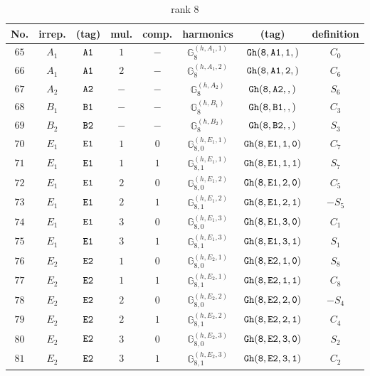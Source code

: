 \documentclass[fleqn,8pt]{jsarticle}
\begin{document}
\begin{table}[ht!]
\begin{center}
\caption{rank 8}
\renewcommand{\arraystretch}{1.3}
\begin{tabular}{cccccccc} \hline \hline
No. & irrep. & (tag) & mul. & comp. & harmonics & (tag) & definition \\ \hline
$ 65 $ & $ A_{1} $ & $ {\tt A1} $ & $ 1 $ & $ - $ & $ \mathbb{G}_{8}^{(h,A_{1},1)} $ & $ {\tt Gh(8,A1,1,)} $ & $ C_{0} $ \\
$ 66 $ & $ A_{1} $ & $ {\tt A1} $ & $ 2 $ & $ - $ & $ \mathbb{G}_{8}^{(h,A_{1},2)} $ & $ {\tt Gh(8,A1,2,)} $ & $ C_{6} $ \\
$ 67 $ & $ A_{2} $ & $ {\tt A2} $ & $ - $ & $ - $ & $ \mathbb{G}_{8}^{(h,A_{2})} $ & $ {\tt Gh(8,A2,,)} $ & $ S_{6} $ \\
$ 68 $ & $ B_{1} $ & $ {\tt B1} $ & $ - $ & $ - $ & $ \mathbb{G}_{8}^{(h,B_{1})} $ & $ {\tt Gh(8,B1,,)} $ & $ C_{3} $ \\
$ 69 $ & $ B_{2} $ & $ {\tt B2} $ & $ - $ & $ - $ & $ \mathbb{G}_{8}^{(h,B_{2})} $ & $ {\tt Gh(8,B2,,)} $ & $ S_{3} $ \\
$ 70 $ & $ E_{1} $ & $ {\tt E1} $ & $ 1 $ & $ 0 $ & $ \mathbb{G}_{8,0}^{(h,E_{1},1)} $ & $ {\tt Gh(8,E1,1,0)} $ & $ C_{7} $ \\
$ 71 $ & $ E_{1} $ & $ {\tt E1} $ & $ 1 $ & $ 1 $ & $ \mathbb{G}_{8,1}^{(h,E_{1},1)} $ & $ {\tt Gh(8,E1,1,1)} $ & $ S_{7} $ \\
$ 72 $ & $ E_{1} $ & $ {\tt E1} $ & $ 2 $ & $ 0 $ & $ \mathbb{G}_{8,0}^{(h,E_{1},2)} $ & $ {\tt Gh(8,E1,2,0)} $ & $ C_{5} $ \\
$ 73 $ & $ E_{1} $ & $ {\tt E1} $ & $ 2 $ & $ 1 $ & $ \mathbb{G}_{8,1}^{(h,E_{1},2)} $ & $ {\tt Gh(8,E1,2,1)} $ & $ - S_{5} $ \\
$ 74 $ & $ E_{1} $ & $ {\tt E1} $ & $ 3 $ & $ 0 $ & $ \mathbb{G}_{8,0}^{(h,E_{1},3)} $ & $ {\tt Gh(8,E1,3,0)} $ & $ C_{1} $ \\
$ 75 $ & $ E_{1} $ & $ {\tt E1} $ & $ 3 $ & $ 1 $ & $ \mathbb{G}_{8,1}^{(h,E_{1},3)} $ & $ {\tt Gh(8,E1,3,1)} $ & $ S_{1} $ \\
$ 76 $ & $ E_{2} $ & $ {\tt E2} $ & $ 1 $ & $ 0 $ & $ \mathbb{G}_{8,0}^{(h,E_{2},1)} $ & $ {\tt Gh(8,E2,1,0)} $ & $ S_{8} $ \\
$ 77 $ & $ E_{2} $ & $ {\tt E2} $ & $ 1 $ & $ 1 $ & $ \mathbb{G}_{8,1}^{(h,E_{2},1)} $ & $ {\tt Gh(8,E2,1,1)} $ & $ C_{8} $ \\
$ 78 $ & $ E_{2} $ & $ {\tt E2} $ & $ 2 $ & $ 0 $ & $ \mathbb{G}_{8,0}^{(h,E_{2},2)} $ & $ {\tt Gh(8,E2,2,0)} $ & $ - S_{4} $ \\
$ 79 $ & $ E_{2} $ & $ {\tt E2} $ & $ 2 $ & $ 1 $ & $ \mathbb{G}_{8,1}^{(h,E_{2},2)} $ & $ {\tt Gh(8,E2,2,1)} $ & $ C_{4} $ \\
$ 80 $ & $ E_{2} $ & $ {\tt E2} $ & $ 3 $ & $ 0 $ & $ \mathbb{G}_{8,0}^{(h,E_{2},3)} $ & $ {\tt Gh(8,E2,3,0)} $ & $ S_{2} $ \\
$ 81 $ & $ E_{2} $ & $ {\tt E2} $ & $ 3 $ & $ 1 $ & $ \mathbb{G}_{8,1}^{(h,E_{2},3)} $ & $ {\tt Gh(8,E2,3,1)} $ & $ C_{2} $ \\
 \hline \hline
\end{tabular}
\end{center}
\end{table}
\end{document}
